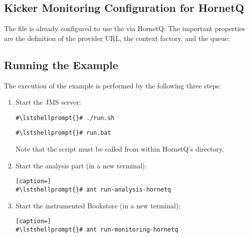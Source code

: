 \subsection{Kicker Monitoring Configuration for HornetQ}

The file  %
is already configured to use the  via HornetQ. The important properties are %
the definition of the provider URL, the context factory, and the queue:

\setPropertiesListing


\setPropertiesListing


\subsection{Running the Example}

 The execution of the example is performed by the following three steps:
\begin{enumerate}
\item Start the JMS server:

\setBashListing
\begin{lstlisting}[caption=Start of the JMS server under UNIX-like systems]
#\lstshellprompt{}# ./run.sh
\end{lstlisting}
\begin{lstlisting}[caption=Start of the JMS server under Windows]
#\lstshellprompt{}# run.bat
\end{lstlisting}

Note that the script must be called from within HornetQ's  directory.

\item Start the analysis part (in a new terminal):
\setBashListing
\begin{lstlisting}[caption=]
#\lstshellprompt{}# ant run-analysis-hornetq
\end{lstlisting}
\item Start the instrumented Bookstore (in a new terminal):
\setBashListing
\begin{lstlisting}[caption=]
#\lstshellprompt{}# ant run-monitoring-hornetq
\end{lstlisting}
\end{enumerate}

